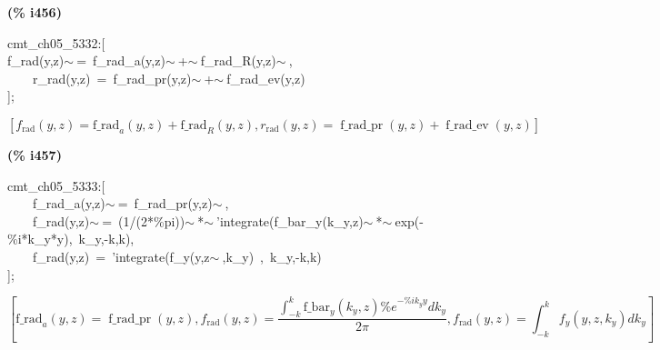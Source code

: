 \documentclass[fleqn]{article}
\begin{document}
\noindent
\begin{minipage}[t]{4.000000em}\color{red}\bfseries
(\% i456)	
\end{minipage}
\begin{minipage}[t]{\textwidth}\color{blue}
cmt\_ch05\_5332:[\\
f\_rad(y,z)\ensuremath{\sim\ }=\ f\_rad\_a(y,z)\ensuremath{\sim\ }+\ensuremath{\sim\ }f\_rad\_R(y,z)\ensuremath{\sim\ },\\
\ \ \ \ r\_rad(y,z)\ =\ f\_rad\_pr(y,z)\ensuremath{\sim\ }+\ensuremath{\sim\ }f\_rad\_ev(y,z)\\
];
\end{minipage}
\[\displaystyle \tag{\% o456} 
\operatorname{[}{f_{\ensuremath{\mathrm{rad}}}}\left( y\operatorname{,}z\right) ={{\ensuremath{\mathrm{f\_ rad}}}_a}\left( y\operatorname{,}z\right) +{{\ensuremath{\mathrm{f\_ rad}}}_R}\left( y\operatorname{,}z\right) \operatorname{,}{r_{\ensuremath{\mathrm{rad}}}}\left( y\operatorname{,}z\right) =\operatorname{f\_ rad\_ pr}\left( y\operatorname{,}z\right) +\operatorname{f\_ rad\_ ev}\left( y\operatorname{,}z\right) \operatorname{]}\mbox{}
\]


\noindent
\begin{minipage}[t]{4.000000em}\color{red}\bfseries
(\% i457)	
\end{minipage}
\begin{minipage}[t]{\textwidth}\color{blue}
cmt\_ch05\_5333:[\\
\ \ \ \ f\_rad\_a(y,z)\ensuremath{\sim\ }=\ f\_rad\_pr(y,z)\ensuremath{\sim\ },\\
\ \ \ \ f\_rad(y,z)\ensuremath{\sim\ }=\ (1/(2*\%pi))\ensuremath{\sim\ }*\ensuremath{\sim\ }'integrate(f\_bar\_y(k\_y,z)\ensuremath{\sim\ }*\ensuremath{\sim\ }exp(-\%i*k\_y*y),\ k\_y,-k,k),\\
\ \ \ \ f\_rad(y,z)\ =\ 'integrate(f\_y(y,z\ensuremath{\sim\ },k\_y)\ ,\ k\_y,-k,k)\\
];
\end{minipage}
\[\displaystyle \tag{\% o457} 
\operatorname{[}{{\ensuremath{\mathrm{f\_ rad}}}_a}\left( y\operatorname{,}z\right) =\operatorname{f\_ rad\_ pr}\left( y\operatorname{,}z\right) \operatorname{,}{f_{\ensuremath{\mathrm{rad}}}}\left( y\operatorname{,}z\right) =\frac{\int_{-k}^{k}{\left. {{\ensuremath{\mathrm{f\_ bar}}}_y}\left( {k_y}\operatorname{,}z\right)  {{\% e}^{-\% i {k_y} y}}d{k_y}\right.}}{2 \ensuremath{\pi} }\operatorname{,}{f_{\ensuremath{\mathrm{rad}}}}\left( y\operatorname{,}z\right) =
\int_{-k}^{k}{\left. {f_y}\left( y\operatorname{,}z\operatorname{,}{k_y}\right) d{k_y}\right.}\operatorname{]}\mbox{}
\]
\end{document}
